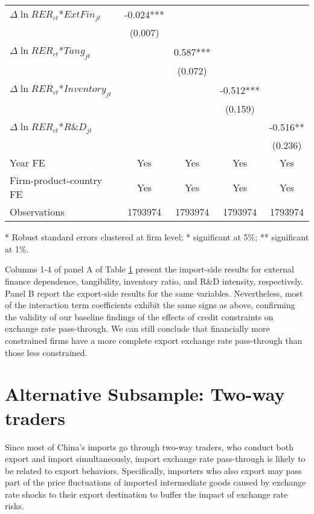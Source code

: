\begin{table}[htbp]
\begin{threeparttable}
\begin{tabular}{lcccc}
		$\Delta \ln RER_{ct}$*$ExtFin_{jt}$ & -0.024*** &       &       &  \\
		& (0.007) &       &       &  \\
		$\Delta \ln RER_{ct}$*$Tang_{jt}$ &       & 0.587*** &       &  \\
		&       & (0.072) &       &  \\
		$\Delta \ln RER_{ct}$*$Inventory_{jt}$ &       &       & -0.512*** &  \\
		&       &       & (0.159) &  \\
		$\Delta \ln RER_{ct}$*$R\&D_{jt}$ &       &       &       & -0.516** \\
		&       &       &       & (0.236) \\
		Year FE  & Yes   & Yes   & Yes   & Yes \\
		Firm-product-country FE & Yes   & Yes   & Yes   & Yes \\
		Observations & 1793974 & 1793974 & 1793974 & 1793974 \\
		\bottomrule
	\end{tabular}
	\label{tab6.1}
	\begin{tablenotes}
		\footnotesize
		\item[*] Robust standard errors clustered at firm level; * significant at 5\%; ** significant at 1\%.
	\end{tablenotes}
	\end{threeparttable}
\end{table}

Columns 1-4 of panel A of Table \ref{tab6.1} present the import-side results for external finance dependence, tangibility, inventory ratio, and R\&D intensity, respectively. Panel B report the export-side results for the same variables. Nevertheless, most of the interaction term coefficients exhibit the same signs as above, confirming the validity of our baseline findings of the effects of credit constraints on exchange rate pass-through. We can still conclude that financially more constrained firms have a more complete export exchange rate pass-through than those less constrained.

\section{Alternative Subsample: Two-way traders}

Since most of China's imports go through two-way traders, who conduct both export and import simultaneously, import exchange rate pass-through is likely to be related to export behaviors. Specifically, importers who also export may pass part of the price fluctuations of imported intermediate goods caused by exchange rate shocks to their export destination to buffer the impact of exchange rate risks. 

